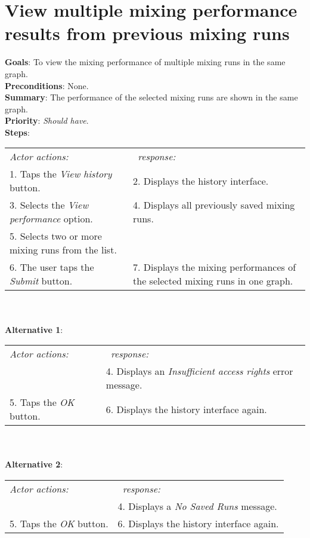     \section{View multiple mixing performance results from previous mixing runs}
  \label{viewmulruns}
  \textbf{Goals}: To view the mixing performance of multiple mixing runs in the same graph.\\
  \textbf{Preconditions}: None.\\
  \textbf{Summary}: The performance of the selected mixing runs are shown in the same graph.\\
  \textbf{Priority}: \emph{Should have}.\\
  \textbf{Steps}: \\
  \begin{tabular}{ p{} p{} }
  	\emph{Actor actions:} & \emph{\projectname\ response:} \\
	1. Taps the \emph{View history} button. & 2. Displays the history interface. \\
	3. Selects the \emph{View performance} option. & 4. Displays all previously saved mixing runs.\\
	 5. Selects two or more mixing runs from the list. & \\
	 6. The user taps the \emph{Submit} button. & 7. Displays the mixing performances of the selected mixing runs in one graph.\\
  \end{tabular}
  \\
     \\\textbf{Alternative 1}: \\
    \begin{tabular}{ p{} p{} }
  	\emph{Actor actions:} & \emph{\projectname\ response:} \\
            & 4. Displays an \emph{Insufficient access rights} error message. \\
    5. Taps the \emph{OK} button. & 6. Displays the history interface again. \\
    \end{tabular}
            \\
     \\\textbf{Alternative 2}: \\
    \begin{tabular}{ p{} p{} }
  	\emph{Actor actions:} & \emph{\projectname\ response:} \\
            & 4. Displays a \emph{No Saved Runs} message. \\
    5. Taps the \emph{OK} button. & 6. Displays the history interface again. \\
    \end{tabular}
    
